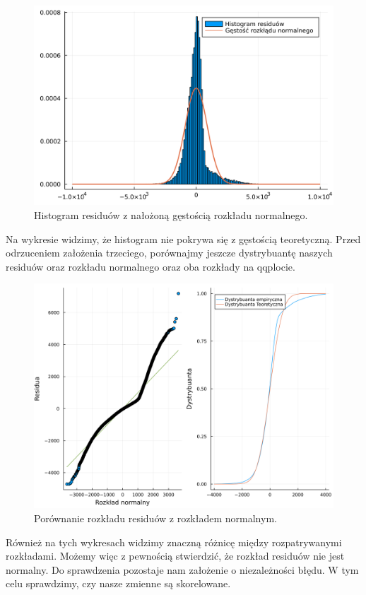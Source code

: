 \documentclass[12pt]{article}
\theoremstyle{exer}
\begin{document}
	\begin{figure}[H]
		\centering
		\includegraphics[width=7\columnwidth/10]{images/Budnik/res_hist.png}
		\caption{Histogram residuów z nałożoną gęstością rozkładu normalnego.}
	\end{figure}
	Na wykresie widzimy, że histogram nie pokrywa się z gęstością teoretyczną. Przed odrzuceniem założenia trzeciego, porównajmy jeszcze dystrybuantę naszych residuów oraz rozkładu normalnego oraz oba rozkłady na qqplocie.
	\begin{figure}[H]
		\centering
		\includegraphics[width=7\columnwidth/10]{images/Budnik/not_zal_3.png}
		\caption{Porównanie rozkładu residuów z rozkładem normalnym.}
	\end{figure}
	Również na tych wykresach widzimy znaczną różnicę między rozpatrywanymi rozkładami. Możemy więc z pewnością stwierdzić, że rozkład residuów nie jest normalny. Do sprawdzenia pozostaje nam założenie o niezależności błędu. W tym celu sprawdzimy, czy nasze zmienne są skorelowane.
\end{document}
